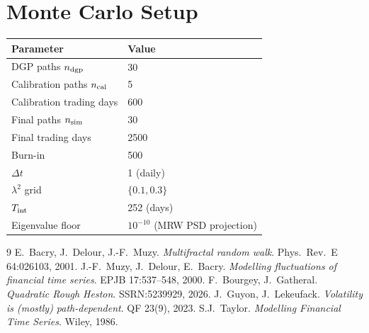 \documentclass[11pt,a4paper]{article}
\begin{document}
\section{Monte Carlo Setup}

\begin{center}\renewcommand{\arraystretch}{1.4}
\begin{tabular}{ll}\toprule Parameter & Value \\\midrule
DGP paths $n_{\rm dgp}$ & 30 \\
Calibration paths $n_{\rm cal}$ & 5 \\
Calibration trading days & 600 \\
Final paths $n_{\rm sim}$ & 30 \\
Final trading days & 2500 \\
Burn-in & 500 \\
$\Delta t$ & 1 (daily) \\
$\lambda^2$ grid & $\{0.1,0.3\}$ \\
$T_{\rm int}$ & 252 (days) \\
Eigenvalue floor & $10^{-10}$ (MRW PSD projection) \\
\bottomrule\end{tabular}\end{center}

\begin{thebibliography}{9}
 E.\ Bacry, J.\ Delour, J.-F.\ Muzy.
\textit{Multifractal random walk}. Phys.\ Rev.\ E 64:026103, 2001.
 J.-F.\ Muzy, J.\ Delour, E.\ Bacry.
\textit{Modelling fluctuations of financial time series}.
EPJB 17:537--548, 2000.
 F.\ Bourgey, J.\ Gatheral.
\textit{Quadratic Rough Heston}. SSRN:5239929, 2026.
 J.\ Guyon, J.\ Lekeufack.
\textit{Volatility is (mostly) path-dependent}. QF 23(9), 2023.
 S.J.\ Taylor.
\textit{Modelling Financial Time Series}. Wiley, 1986.
\end{thebibliography}
\end{document}
